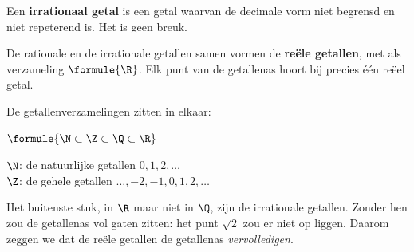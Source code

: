 \begin{theorie}
Een \textbf{\textcolor{accent}{irrationaal getal}} is een getal waarvan de decimale vorm niet begrensd en niet repeterend is. Het is geen breuk.

De rationale en de irrationale getallen samen vormen de \textbf{\textcolor{accent}{reële getallen}}, met als verzameling $\formule{\R}$. Elk punt van de getallenas hoort bij precies één reëel getal.

\begin{minipage}[t]{.5\linewidth}
\vspace{0pt}
De getallenverzamelingen zitten in elkaar:

\vspace{1mm}
\qquad $\formule{\N \subset \Z \subset \Q \subset \R}$

\vspace{1mm}
$\N$: de natuurlijke getallen $0, 1, 2, \ldots$\\
$\Z$: de gehele getallen $\ldots, {-2}, {-1}, 0, 1, 2, \ldots$
\end{minipage}\hfill
\begin{minipage}[t]{.46\linewidth}
\vspace{0pt}\centering
{}
\end{minipage}
\end{theorie}

Het buitenste stuk, in $\R$ maar niet in $\Q$, zijn de irrationale getallen. Zonder hen zou de getallenas vol gaten zitten: het punt $\sqrt2$ zou er niet op liggen. Daarom zeggen we dat de reële getallen de getallenas \textit{vervolledigen}.


